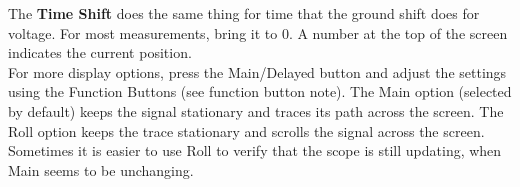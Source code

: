 \documentclass{article} %
\begin{document}
The {\bf Time Shift} does the same thing for time that the ground shift does for voltage. For most measurements, bring it to 0.  A number at the top of the screen indicates the current position. \\

For more display options, press the Main/Delayed button and adjust the settings using the Function Buttons (see function button note). The Main option (selected by default) keeps the signal stationary and traces its path across the screen. The Roll option keeps the trace stationary and scrolls the signal across the screen. Sometimes it is easier to use Roll to verify that the scope is still updating, when Main seems to be unchanging.
\end{document}
